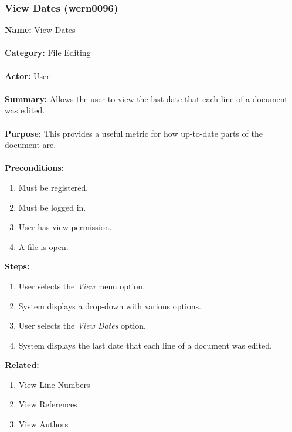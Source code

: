 \documentclass[11pt]{report}
\begin{document}
\subsubsection{View Dates (wern0096)}
\begin{framed}
	\noindent\textbf{Name:} View Dates \\ \\
	\textbf{Category:} File Editing \\ \\
	\textbf{Actor:} User \\ \\
	\textbf{Summary:} Allows the user to view the last date that each line of a document was edited. \\ \\
	\textbf{Purpose:} This provides a useful metric for how up-to-date parts of the document are. \\ \\
	\textbf{Preconditions:} 
	\begin{enumerate}
		\item Must be registered.
		\item Must be logged in.
		\item User has view permission.
		\item A file is open.
	\end{enumerate}
	\textbf{Steps:}
	\begin{enumerate}
		\item User selects the \textit{View} menu option.
		\item System displays a drop-down with various options.
		\item User selects the \textit{View Dates} option.
		\item System displays the last date that each line of a document was edited.
	\end{enumerate}
	\textbf{Related:}
	\begin{enumerate}
		\item View Line Numbers
		\item View References
		\item View Authors
	\end{enumerate}
\end{framed}

\newpage
\end{document}
